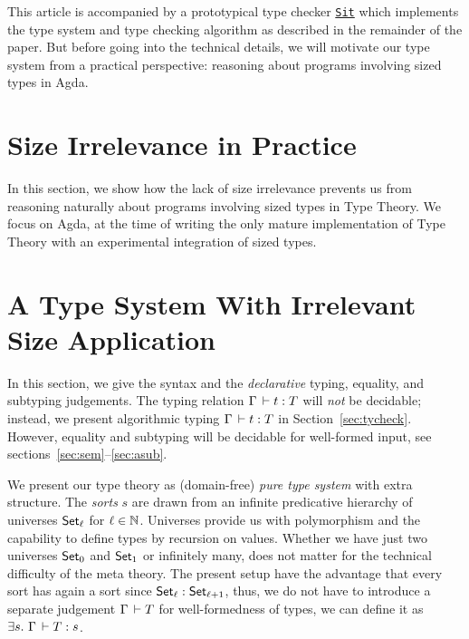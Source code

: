 \documentclass[acmsmall,screen]{acmart}\settopmatter{}
\begin{document}
This article is accompanied by a prototypical type checker \href{https://hackage.haskell.org/package/Sit}{\texttt{Sit}} which implements the type system and type checking algorithm as described in the remainder of the paper.
But before going into the technical details, we will motivate our type system from a practical perspective: reasoning about programs involving sized types in Agda.


\section{Size Irrelevance in Practice}
\label{sec:informal}

In this section, we show how the lack of size irrelevance prevents us from reasoning naturally about programs involving sized types in Type Theory.  We focus on Agda, at the time of writing the only mature implementation of Type Theory with an experimental integration of sized types.





\section{A Type System With Irrelevant Size Application}
\label{sec:syntax}

In this section, we give the syntax and the \emph{declarative} typing, equality, and subtyping judgements.  The typing relation $\Gamma \der t : T$ will \emph{not} be decidable; instead, we present algorithmic typing $\Gamma \der t \jchk T$ in Section~\ref{sec:tycheck}.  However, equality and subtyping will be decidable for well-formed input, see sections~\ref{sec:sem}--\ref{sec:asub}.

We present our type theory as (domain-free) \emph{pure type system} \cite{barendregt:lambdacube} with extra structure.
The \emph{sorts} $s$ are drawn from an infinite predicative hierarchy of universes $\Set[\ell]$ for $\ell \in \NN$.  Universes provide us with polymorphism and the capability to define types by recursion on values.  Whether we have just two universes $\Set[0]$ and $\Set[1]$ or infinitely many, does not matter for the technical difficulty of the meta theory.  The present setup have the advantage that every sort has again a sort since $\Set[\ell] : \Set[\ell+1]$, thus, we do not have to introduce a separate judgement $\Gamma \der T$ for well-formedness of types, we can define it as $\exists s.\ \Gamma \der T : s$.
\end{document}
